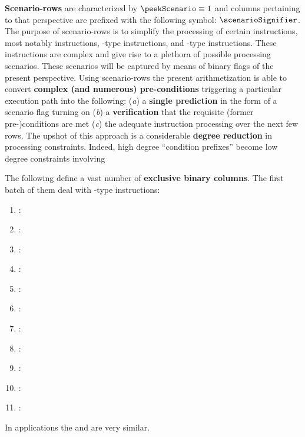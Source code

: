 \textbf{Scenario-rows} are characterized by $\peekScenario \equiv 1$ and columns pertaining to that perspective are prefixed with the following symbol: $\scenarioSignifier$. 
The purpose of scenario-rows is to simplify the processing of certain instructions, most notably
 instructions,
-type instructions, and
-type instructions.
These instructions are complex and give rise to a plethora of possible processing scenarios.
These scenarios will be captured by means of binary flags of the present perspective.
Using scenario-rows the present arithmetization is able to convert \textbf{complex (and numerous) pre-conditions} triggering a particular execution path into the following:
(\emph{a}) a \textbf{single prediction} in the form of a scenario flag turning on
(\emph{b}) a \textbf{verification} that the requisite (former pre-)conditions are met
(\emph{c}) the adequate instruction processing over the next few rows.
The upshot of this approach is a considerable \textbf{degree reduction} in processing constraints.
Indeed, high degree ``condition prefixes'' become low degree constraints involving 

The following define a vast number of \textbf{exclusive binary columns}.
The first batch of them deal with -type instructions:
\begin{enumerate}
	\item \scenCallAbort:
	\item \scenCallToEoaCallerWontRevert:
	\item \scenCallToEoaCallerWillRevert:
	\item \scenCallToSmartContractCallerWontRevertCalleeSuccess:
	\item \scenCallToSmartContractCallerWontRevertCalleeFailure:
	\item \scenCallToSmartContractCallerWillRevertCalleeSuccess:
	\item \scenCallToSmartContractCallerWillRevertCalleeFailure:
	\item \scenCallToPrecompileSuccessCallerWontRevert:
	\item \scenCallToPrecompileSuccessCallerWillRevert:
	\item \scenCallToPrecompileFailureCallerWontRevert:
	\item \scenCallToPrecompileFailureCallerWillRevert:
\end{enumerate}
\saNote{} In applications the
\scenCallToPrecompileFailureCallerWontRevert{} and \scenCallToPrecompileFailureCallerWillRevert{}
are very similar.


